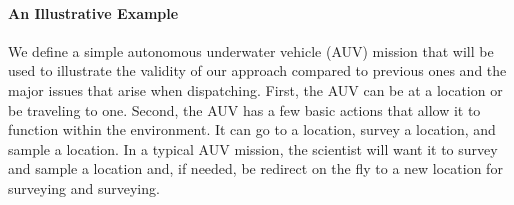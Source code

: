 \paragraph{An Illustrative Example} We define a simple autonomous underwater vehicle (AUV) mission
that will be used to illustrate the validity of our approach compared to previous ones and the major issues that
arise when dispatching. First, the AUV can be at a location or be
traveling to one. Second, the AUV has a few basic actions that allow it to function within the environment. 
It can go to a location, survey a location, and sample a location. In a typical AUV mission,
the scientist will want it to survey and sample a location and, if needed, be redirect on the fly to a new
location for surveying and surveying. 

\begin{figure}
  \centering
  \\

\end{figure}
